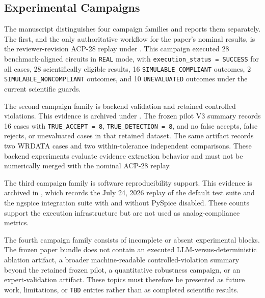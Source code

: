 \subsection{Experimental Campaigns}
The manuscript distinguishes four campaign families and reports them separately. The first, and the only authoritative workflow for the paper's nominal results, is the reviewer-revision ACP-28 replay under . This campaign executed 28 benchmark-aligned circuits in \texttt{REAL} mode, with \texttt{execution\_status = SUCCESS} for all cases, 28 scientifically eligible results, 16 \texttt{SIMULABLE\_COMPLIANT} outcomes, 2 \texttt{SIMULABLE\_NONCOMPLIANT} outcomes, and 10 \texttt{UNEVALUATED} outcomes under the current scientific guards.

The second campaign family is backend validation and retained controlled violations. This evidence is archived under . The frozen pilot V3 summary records 16 cases with \texttt{TRUE\_ACCEPT = 8}, \texttt{TRUE\_DETECTION = 8}, and no false accepts, false rejects, or unevaluated cases in that retained dataset. The same artifact records two WRDATA cases and two within-tolerance independent comparisons. These backend experiments evaluate evidence extraction behavior and must not be numerically merged with the nominal ACP-28 replay.

The third campaign family is software reproducibility support. This evidence is archived in , which records the July 24, 2026 replay of the default test suite and the ngspice integration suite with and without PySpice disabled. These counts support the execution infrastructure but are not used as analog-compliance metrics.

The fourth campaign family consists of incomplete or absent experimental blocks. The frozen paper bundle does not contain an executed LLM-versus-deterministic ablation artifact, a broader machine-readable controlled-violation summary beyond the retained frozen pilot, a quantitative robustness campaign, or an expert-validation artifact. These topics must therefore be presented as future work, limitations, or \texttt{TBD} entries rather than as completed scientific results.

